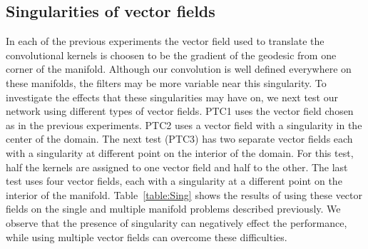 \documentclass[10pt,twocolumn,letterpaper]{article}
\begin{document}
\subsection{Singularities of vector fields}
In each of the previous experiments the vector field used to translate the convolutional kernels is choosen to be the gradient of the geodesic from one corner of the manifold. Although our convolution is well defined everywhere on these manifolds, the filters may be more variable near this singularity. To investigate the effects that these singularities may have on,  we next test our network using  different types of vector fields. PTC1 uses the vector field chosen as in the previous experiments. PTC2 uses a vector field with a singularity in the center of the domain. The next test (PTC3) has two separate vector fields each with a singularity at different point on the interior of the domain. For this test, half the kernels are assigned to one vector field and half to the other. The last test uses four vector fields, each with a singularity at a different point on the interior of the manifold. Table~\ref{table:Sing} shows the results of using these vector fields on the single and multiple manifold problems described previously. We observe that the presence of singularity can negatively effect the performance, while using multiple vector fields can overcome these difficulties.
%
\begin{table}[htp]
\begin{center}
\end{center}
\caption{Success rate (SR) comparison of several of our networks on a single (the $4^{th}$ coloum) and on multiple manifolds (the $5^{th}$ coloumn).}
\label{table:Sing}
\end{table}
\end{document}
